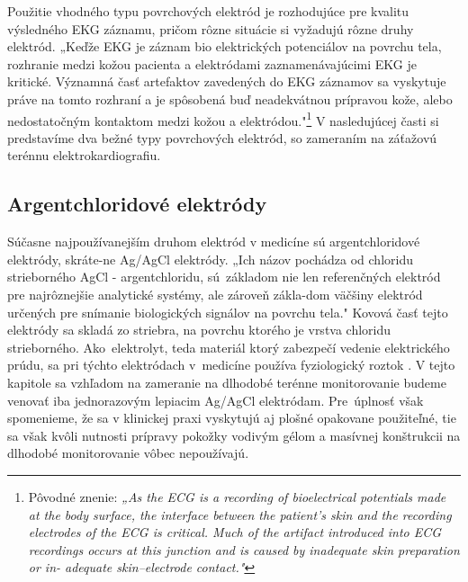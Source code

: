 Použitie vhodného typu povrchových elektród je rozhodujúce pre kvalitu výsledného EKG záznamu, pričom rôzne situácie si vyžadujú rôzne druhy elektród. „Keďže EKG je záznam bio elektrických potenciálov na povrchu tela, rozhranie medzi kožou pacienta a elektródami zaznamenávajúcimi EKG je kritické. Významná časť artefaktov zavedených do EKG záznamov sa vyskytuje práve na tomto rozhraní a je spôsobená buď neadekvátnou prípravou kože, alebo nedostatočným kontaktom medzi kožou a elektródou."\footnote{Pôvodné znenie: \textit{„As the ECG is a recording of bioelectrical potentials made at the body surface, the interface between the patient’s skin and the recording electrodes of the ECG is critical. Much of the artifact introduced into ECG recordings occurs at this junction and is caused by inadequate skin preparation or in- adequate skin–electrode contact."}} \cite{Garvey2006} V nasledujúcej časti si predstavíme dva bežné typy povrchových elektród, so zameraním na záťažovú terénnu elektrokardiografiu.

\subsection{Argentchloridové elektródy}

Súčasne najpoužívanejším druhom elektród v medicíne sú argentchloridové elektródy, skráte-ne Ag/AgCl elektródy. „Ich názov pochádza od chloridu strieborného AgCl - argentchloridu, sú~základom nie len referenčných elektród pre najrôznejšie analytické systémy, ale zároveň zákla-dom väčšiny elektród určených pre snímanie biologických signálov na povrchu tela." \cite{Roubík2007} Kovová časť tejto elektródy sa skladá zo striebra, na povrchu ktorého je vrstva chloridu strieborného. Ako~elektrolyt, teda materiál ktorý zabezpečí vedenie elektrického prúdu, sa pri týchto elektródach v~medicíne používa fyziologický roztok \cite{Roubík2007}. V tejto kapitole sa vzhľadom na zameranie na dlhodobé terénne monitorovanie budeme venovať iba jednorazovým lepiacim Ag/AgCl elektródam. Pre~úplnosť však spomenieme, že sa v klinickej praxi vyskytujú aj plošné opakovane použiteľné, tie sa však kvôli nutnosti prípravy pokožky vodivým gélom a masívnej konštrukcii na dlhodobé monitorovanie vôbec nepoužívajú.

